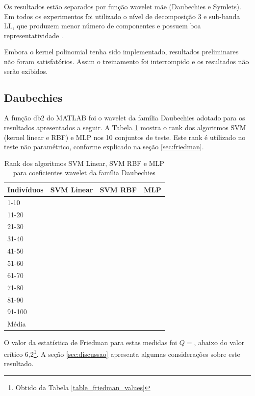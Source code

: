 \documentclass[conference]{IEEEtran}
\begin{document}
Os resultados estão separados por função wavelet mãe (Daubechies e Symlets). Em todos os experimentos foi utilizado o nível de decomposição 3 e sub-banda LL, que produzem menor número de componentes e possuem boa representatividade \cite{burrus1997introduction}. 

Embora o kernel polinomial tenha sido implementado, resultados preliminares não foram satisfatórios. Assim o treinamento foi interrompido e os resultados não serão exibidos.


\subsection{Daubechies}
A função db2 do MATLAB foi o wavelet da família Daubechies adotado para os resultados apresentados a seguir. A Tabela \ref{table_db2_rank} mostra o rank dos algoritmos SVM (kernel linear e RBF) e MLP nos 10 conjuntos de teste. Este rank é utilizado no teste não paramétrico, conforme explicado na seção \ref{sec:friedman}.

\begin{table}[!t]
\caption{Rank dos algoritmos SVM Linear, SVM RBF e MLP para coeficientes wavelet da família Daubechies}
\label{table_db2_rank}
\centering
\begin{tabular}{lccc}
\hline
Indivíduos & SVM Linear & SVM RBF & MLP \\
\hline
1-10   &  &  &  \\
11-20  &  &  &  \\
21-30  &  &  &  \\
31-40  &  &  &  \\
41-50  &  &  &  \\
51-60  &  &  &  \\
61-70  &  &  &  \\
71-80  &  &  &  \\
81-90  &  &  &  \\
91-100 &  &  &  \\ \hline
Média  &  &  &  \\
\end{tabular}
\end{table}

O valor da estatística de Friedman para estas medidas foi $Q = $, abaixo do valor crítico 6,2\footnote{Obtido da Tabela \ref{table_friedman_values}}. A seção \ref{sec:discussao} apresenta algumas considerações sobre este resultado.
\end{document}
